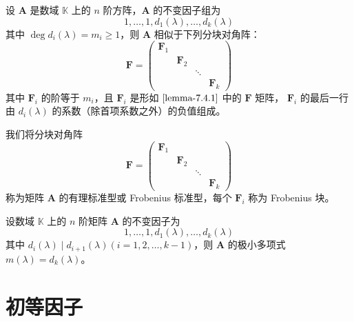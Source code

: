 \begin{theorem}
    设 $\bm{A}$ 是数域 $\mathbb{K}$ 上的 $n$ 阶方阵，$\bm{A}$ 的不变因子组为
    \[
        1, \ldots, 1, d_{1}(\lambda), \ldots, d_{k}(\lambda)
    \]
    其中 $\deg d_{i}(\lambda) = m_{i} \geqslant 1$，则 $\bm{A}$ 相似于下列分块对角阵：
    \begin{equation}
        \bm{F} = \begin{pmatrix}
            \bm{F}_{1} & \          & \                   \\
            \          & \bm{F}_{2} & \      & \          \\
            \          & \          & \ddots & \          \\
            \          & \          & \      & \bm{F}_{k}
        \end{pmatrix}\label{equation-7.4.4}
    \end{equation}
    其中 $\bm{F}_i$ 的阶等于 $m_i$，且 $\bm{F}_i$ 是形如 $\ref{lemma-7.4.1}$ 中的 $\bm{F}$ 矩阵， $\bm{F}_i$ 的最后一行由 $d_{i}(\lambda)$ 的系数（除首项系数之外）的负值组成。
\end{theorem}

\begin{definition}
    我们将分块对角阵
    \begin{equation*}
        \bm{F} = \begin{pmatrix}
            \bm{F}_{1} & \          & \                   \\
            \          & \bm{F}_{2} & \      & \          \\
            \          & \          & \ddots & \          \\
            \          & \          & \      & \bm{F}_{k}
        \end{pmatrix}
    \end{equation*}
    称为矩阵 $\bm{A}$ 的有理标准型或 Frobenius 标准型，每个 $\bm{F}_i$ 称为 Frobenius 块。
\end{definition}

\begin{theorem}
    设数域 $\mathbb{K}$ 上的 $n$ 阶矩阵 $\bm{A}$ 的不变因子为
    \[
        1, \ldots, 1, d_{1}(\lambda), \ldots, d_{k}(\lambda)
    \]
    其中 $d_{i}(\lambda) \mid d_{i + 1}(\lambda)(i = 1, 2, \ldots, k - 1)$，则 $\bm{A}$ 的极小多项式 $m(\lambda) = d_{k}(\lambda)$。
\end{theorem}


\section{初等因子}

